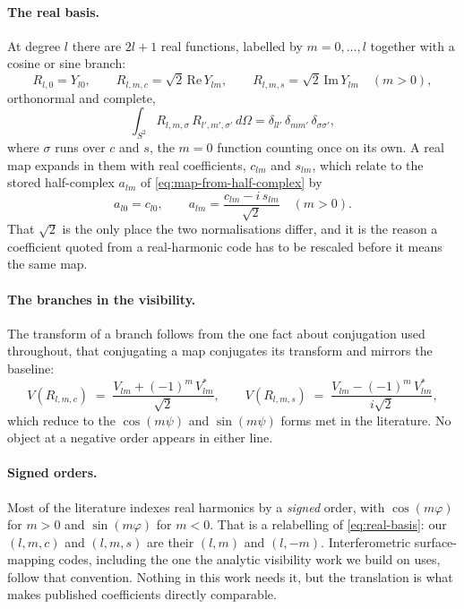\paragraph{The real basis.}  At degree $l$ there are $2l+1$ real functions, labelled by
$m = 0, \dots, l$ together with a cosine or sine branch:
\begin{equation}
  R_{l,0} = Y_{l0} , \qquad
  R_{l,m,c} = \sqrt{2}\,\mathrm{Re}\,Y_{lm} , \qquad
  R_{l,m,s} = \sqrt{2}\,\mathrm{Im}\,Y_{lm} \quad (m > 0) ,
  \label{eq:real-basis}
\end{equation}
orthonormal and complete,
\begin{equation}
  \int_{S^2} R_{l,m,\sigma} \, R_{l',m',\sigma'} \, d\Omega
  = \delta_{ll'} \, \delta_{mm'} \, \delta_{\sigma\sigma'} ,
  \label{eq:real-orthonormal}
\end{equation}
where $\sigma$ runs over $c$ and $s$, the $m = 0$ function counting once on its own.  A real
map expands in them with real coefficients, $c_{lm}$ and $s_{lm}$, which relate to the stored
half-complex $a_{lm}$ of \eqref{eq:map-from-half-complex} by
\begin{equation}
  a_{l0} = c_{l0} , \qquad
  a_{lm} = \frac{c_{lm} - i\,s_{lm}}{\sqrt{2}} \quad (m > 0) .
  \label{eq:half-complex}
\end{equation}
That $\sqrt{2}$ is the only place the two normalisations differ, and it is the reason a
coefficient quoted from a real-harmonic code has to be rescaled before it means the same
map.

\paragraph{The branches in the visibility.}  The transform of a branch follows from the one
fact about conjugation used throughout, that conjugating a map conjugates its transform and
mirrors the baseline:
\begin{equation}
  V(R_{l,m,c}) \;=\; \frac{V_{lm} + (-1)^m\,V_{lm}^*}{\sqrt2} ,
  \qquad
  V(R_{l,m,s}) \;=\; \frac{V_{lm} - (-1)^m\,V_{lm}^*}{i\sqrt2} ,
  \label{eq:real-branch-visibilities}
\end{equation}
which reduce to the $\cos(m\psi)$ and $\sin(m\psi)$ forms met in the literature.  No object
at a negative order appears in either line.

\paragraph{Signed orders.}  Most of the literature indexes real harmonics by a \emph{signed}
order, with $\cos(m\varphi)$ for $m > 0$ and $\sin(m\varphi)$ for $m < 0$.  That is a
relabelling of \eqref{eq:real-basis}: our $(l, m, c)$ and $(l, m, s)$ are their $(l, m)$ and
$(l, -m)$.  Interferometric surface-mapping codes, including the one the analytic visibility
work we build on uses, follow that convention.  Nothing in this work needs it, but the
translation is what makes published coefficients directly comparable.

